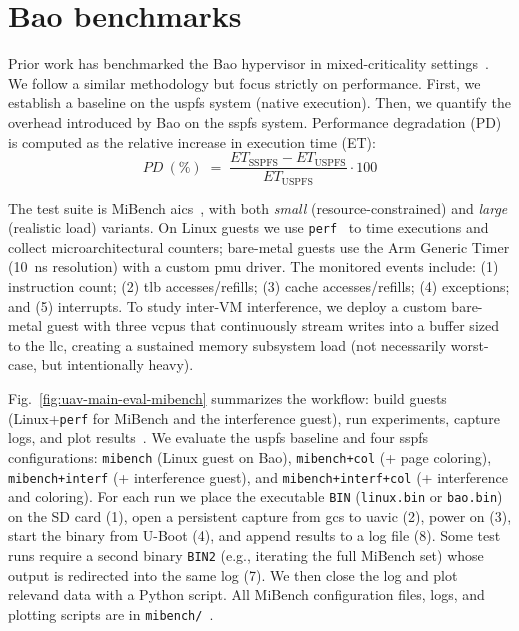 \section{Bao benchmarks}
\label{sec:bao-benchmarks}
Prior work has benchmarked the Bao hypervisor in mixed-criticality settings~\cite{martins2023shedding,costaIRQColoring2023}. We follow a similar methodology but focus strictly on performance. First, we establish a baseline on the \gls{uspfs} system (native execution). Then, we quantify the overhead introduced by Bao on the \gls{sspfs} system. Performance degradation (PD) is computed as the relative increase in execution time (ET):
\begin{equation}
  \label{eq:perform-deg}
  PD~(\%) \;=\;
  \frac{ET_{\text{SSPFS}} - ET_{\text{USPFS}}}{ET_{\text{USPFS}}}\cdot 100
\end{equation}

The test suite is MiBench \gls{aics}~\cite{guthaus2001mibench}, with both \emph{small} (resource-constrained) and \emph{large} (realistic load) variants. On Linux guests we use \lstinline{perf}~\cite{perfLinux} to time executions and collect microarchitectural counters; bare-metal guests use the Arm Generic Timer (10~ns resolution) with a custom \gls{pmu} driver. The monitored events include: (1) instruction count; (2) \gls{tlb} accesses/refills; (3) cache accesses/refills; (4) exceptions; and (5) interrupts.
%
To study inter-VM interference, we deploy a custom bare-metal guest with three
\glspl{vcpu} that continuously stream writes into a buffer sized to the
\gls{llc}, creating a sustained memory subsystem load (not necessarily
worst-case, but intentionally heavy).

Fig.~\ref{fig:uav-main-eval-mibench} summarizes the workflow: build guests (Linux+\lstinline{perf} for MiBench and the interference guest), run experiments, capture logs, and plot results~\cite{shedlightRepo}. We evaluate the \gls{uspfs} baseline and four \gls{sspfs} configurations:
\lstinline{mibench} (Linux guest on Bao),
\lstinline{mibench+col} (+ page coloring),
\lstinline{mibench+interf} (+ interference guest),
and \lstinline{mibench+interf+col} (+ interference and coloring).
For each run we place the executable \lstinline{BIN} (\lstinline{linux.bin} or
\lstinline{bao.bin}) on the SD card (1), open a persistent capture from
\gls{gcs} to \gls{uavic} (2), power on (3), start the binary from U-Boot (4),
and append results to a log file (8). Some test runs require a second binary
\lstinline{BIN2} (e.g., iterating the full MiBench set) whose output is
redirected into the same log (7). We then close the log and plot relevand data
with a Python script. All MiBench configuration files, logs, and plotting scripts are in
\lstinline{mibench/}~\cite{thesis-sw-github}.

